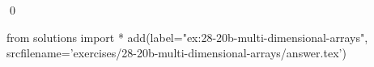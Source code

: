 
\begin{ex} 
  \label{ex:28-20b-multi-dimensional-arrays}
  
  \qed
\end{ex} 
\begin{python0}
from solutions import *
add(label="ex:28-20b-multi-dimensional-arrays",
    srcfilename='exercises/28-20b-multi-dimensional-arrays/answer.tex') 
\end{python0}
